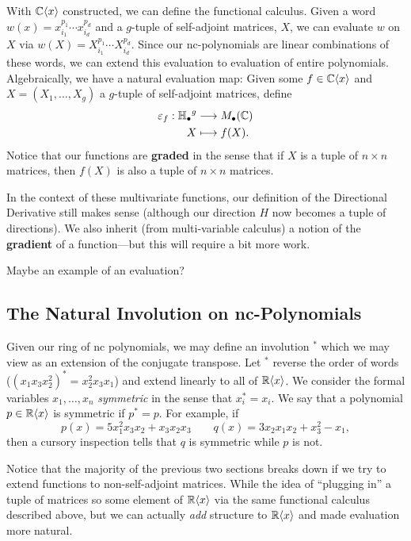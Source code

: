 With \(\mathbb{C} \langle x \rangle \) constructed, we can define the functional
calculus. Given a word \(w(x) = x_{i_1}^{p_1}\cdots x_{i_d}^{p_d}\) and a
\(g\)-tuple of self-adjoint matrices, \(X\), we can evaluate \(w\) on \(X\) via
\(w(X) = X_{i_1}^{p_1}\cdots X_{i_d}^{p_d}\). Since our nc-polynomials are
linear combinations of these words, we can extend this evaluation to evaluation
of entire polynomials. Algebraically, we have a natural evaluation map:
Given some \(f \in \mathbb{C} \langle x \rangle \) and
\(X = \left( X_1, \dots ,X_g \right) \) a
\(g\)-tuple of self-adjoint matrices, define
\begin{align*}
  \varepsilon_f: {\mathbb{H}_\bullet}^g &\longrightarrow M_\bullet(\mathbb{C}) \\
             X &\longmapsto f(X)
.\end{align*}
Notice that our functions are \textbf{graded} in the sense that if \(X\) is a
tuple of \(n \times n\) matrices, then \(f(X)\) is also a tuple of
\(n \times n\) matrices.

In the context of these multivariate functions, our definition of the
Directional Derivative still makes sense (although our direction \(H\) now
becomes a tuple of directions). We also inherit (from multi-variable calculus) a
notion of the \textbf{gradient} of a function---but this will require a bit more work.

{\color{blue} Maybe an example of an evaluation?}

\subsection{The Natural Involution on nc-Polynomials}%
\label{ssec:NatInvo}

Given our ring of nc polynomials, we may define an involution \(^*\) which we
may view as an extension of the conjugate transpose. Let \(^*\) reverse the
order of words (\ie \((x_1x_3x_2^2)^* = x_2^2x_3x_1\)) and extend linearly to
all of \(\mathbb{R} \langle x \rangle \). We consider the formal
variables \(x_1, \dots , x_n\) \emph{symmetric} in the sense that
\(x_i^* = x_i\). We say that a polynomial \(p \in \mathbb{R} \langle x \rangle \) is
symmetric if \(p^* = p\). For example, if
\[
  p(x) = 5x_1^2x_3x_2 + x_3x_2x_3 \qquad q(x) = 3x_2x_1x_2 + x_3^2 - x_1 ,
\]
then a cursory inspection tells that \(q\) is symmetric while \(p\) is not.

Notice that the majority of the previous two sections breaks down if we try to
extend functions to non-self-adjoint matrices. While the idea of ``plugging in''
a tuple of matrices so some element of \(\mathbb{R} \langle x \rangle \) via the same
functional calculus described above, but we can actually \emph{add} structure to
\(\mathbb{R} \langle x \rangle \) and made evaluation more natural.

